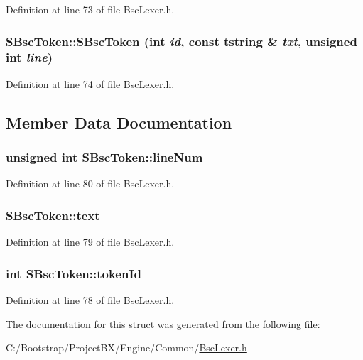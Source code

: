 Definition at line 73 of file BscLexer.h.\hypertarget{struct_s_bsc_token_1ecf4a1d225a56ce532f5c54d3ba7649}{
\subsubsection[{SBscToken}]{\setlength{\rightskip}{0pt plus 5cm}SBscToken::SBscToken (int {\em id}, \/  const {\bf tstring} \& {\em txt}, \/  unsigned int {\em line})}}
\label{struct_s_bsc_token_1ecf4a1d225a56ce532f5c54d3ba7649}




Definition at line 74 of file BscLexer.h.

\subsection{Member Data Documentation}
\hypertarget{struct_s_bsc_token_dbc25dbe5769bbd0be6cf95e2b7fab77}{
\subsubsection[{lineNum}]{\setlength{\rightskip}{0pt plus 5cm}unsigned int {\bf SBscToken::lineNum}}}
\label{struct_s_bsc_token_dbc25dbe5769bbd0be6cf95e2b7fab77}




Definition at line 80 of file BscLexer.h.\hypertarget{struct_s_bsc_token_cecfc1abee39ac469aeda97016d2e5fe}{
\subsubsection[{text}]{ {\bf SBscToken::text}}}
\label{struct_s_bsc_token_cecfc1abee39ac469aeda97016d2e5fe}




Definition at line 79 of file BscLexer.h.\hypertarget{struct_s_bsc_token_0c4dfdfcd3c3fcbffd6bb515b7e7a1c4}{
\subsubsection[{tokenId}]{\setlength{\rightskip}{0pt plus 5cm}int {\bf SBscToken::tokenId}}}
\label{struct_s_bsc_token_0c4dfdfcd3c3fcbffd6bb515b7e7a1c4}




Definition at line 78 of file BscLexer.h.

The documentation for this struct was generated from the following file:\begin{CompactItemize}
\item 
C:/Bootstrap/ProjectBX/Engine/Common/\hyperlink{_bsc_lexer_8h}{BscLexer.h}\end{CompactItemize}
